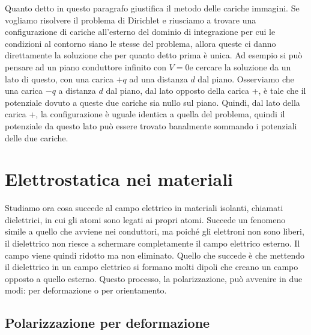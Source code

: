 \documentclass{article}
\numberwithin{equation}{section}
\begin{document}
Quanto detto in questo paragrafo giustifica il metodo delle cariche immagini. Se vogliamo risolvere il problema di Dirichlet e riusciamo a trovare una configurazione di cariche all'esterno del dominio di integrazione per cui le condizioni al contorno siano le stesse del problema, allora queste ci danno direttamente la soluzione che per quanto detto prima è unica. Ad esempio si può pensare ad un piano conduttore infinito con $V=0$e cercare la soluzione da un lato di questo, con una carica $+q$ ad una distanza $d$ dal piano. Osserviamo che una carica $-q$ a distanza $d$ dal piano, dal lato opposto della carica +, è tale che il potenziale dovuto a queste due cariche sia nullo sul piano. Quindi, dal lato della carica +, la configurazione è uguale identica a quella del problema, quindi il potenziale da questo lato può essere trovato banalmente sommando i potenziali delle due cariche.



\section{Elettrostatica nei materiali} %
\label{sec:elettrostatica_nei_materiali}

Studiamo ora cosa succede al campo elettrico in materiali isolanti, chiamati dielettrici, in cui gli atomi sono legati ai propri atomi. Succede un fenomeno simile a quello che avviene nei conduttori, ma poiché gli elettroni non sono liberi, il dielettrico non riesce a schermare completamente il campo elettrico esterno. Il campo viene quindi ridotto ma non eliminato. Quello che succede è che mettendo il dielettrico in un campo elettrico si formano molti dipoli che creano un campo opposto a quello esterno. Questo processo, la polarizzazione, può avvenire in due modi: per deformazione o per orientamento.

\subsection{Polarizzazione per deformazione} %
\label{ssub:polarizzazione_per_deformazione}
\end{document}

